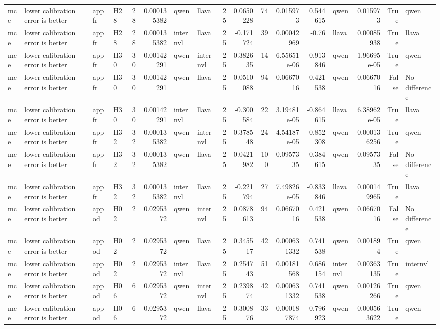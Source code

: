 \begin{longtable}{llllrrllrrrrrlrrl}
mce & lower calibration error is better & appfr & H28 & 28 & 0.000135382 & qwen & llava & 25 & 0.0650228 & 74 & 0.015973 & 0.544615 & qwen & 0.015973 & True & qwen \\
mce & lower calibration error is better & appfr & H28 & 28 & 0.000135382 & internvl & llava & 25 & -0.171724 & 39 & 0.00042969 & -0.76 & llava & 0.00085938 & True & llava \\
mce & lower calibration error is better & appfr & H30 & 30 & 0.00142291 & qwen & internvl & 25 & 0.382635 & 14 & 6.55651e-06 & 0.913846 & qwen & 1.96695e-05 & True & qwen \\
mce & lower calibration error is better & appfr & H30 & 30 & 0.00142291 & qwen & llava & 25 & 0.0510088 & 94 & 0.0667016 & 0.421538 & qwen & 0.0667016 & False & No difference \\
mce & lower calibration error is better & appfr & H30 & 30 & 0.00142291 & internvl & llava & 25 & -0.300584 & 22 & 3.19481e-05 & -0.864615 & llava & 6.38962e-05 & True & llava \\
mce & lower calibration error is better & appfr & H32 & 32 & 0.000135382 & qwen & internvl & 25 & 0.378548 & 24 & 4.54187e-05 & 0.852308 & qwen & 0.000136256 & True & qwen \\
mce & lower calibration error is better & appfr & H32 & 32 & 0.000135382 & qwen & llava & 25 & 0.0421982 & 100 & 0.0957335 & 0.384615 & qwen & 0.0957335 & False & No difference \\
mce & lower calibration error is better & appfr & H32 & 32 & 0.000135382 & internvl & llava & 25 & -0.221794 & 27 & 7.49826e-05 & -0.833846 & llava & 0.000149965 & True & llava \\
mce & lower calibration error is better & appod & H02 & 2 & 0.0295372 & qwen & internvl & 25 & 0.0878613 & 94 & 0.0667016 & 0.421538 & qwen & 0.0667016 & False & No difference \\
mce & lower calibration error is better & appod & H02 & 2 & 0.0295372 & qwen & llava & 25 & 0.345517 & 42 & 0.000631332 & 0.741538 & qwen & 0.001894 & True & qwen \\
mce & lower calibration error is better & appod & H02 & 2 & 0.0295372 & internvl & llava & 25 & 0.254743 & 51 & 0.00181568 & 0.686154 & internvl & 0.00363135 & True & internvl \\
mce & lower calibration error is better & appod & H06 & 6 & 0.0295372 & qwen & internvl & 25 & 0.239874 & 42 & 0.000631332 & 0.741538 & qwen & 0.00126266 & True & qwen \\
mce & lower calibration error is better & appod & H06 & 6 & 0.0295372 & qwen & llava & 25 & 0.300876 & 33 & 0.000187874 & 0.796923 & qwen & 0.000563622 & True & qwen \\

\end{longtable}
